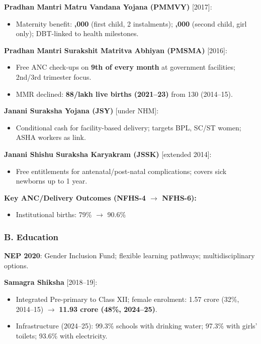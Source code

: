 \textbf{Pradhan Mantri Matru Vandana Yojana (PMMVY)} [2017]:
\begin{itemize}
  \item Maternity benefit: \textbf{,000} (first child, 2 instalments); \textbf{,000} (second child, girl only); DBT-linked to health milestones.
\end{itemize}

\textbf{Pradhan Mantri Surakshit Matritva Abhiyan (PMSMA)} [2016]:
\begin{itemize}
  \item Free ANC check-ups on \textbf{9th of every month} at government facilities; 2nd/3rd trimester focus.
  \item MMR declined: \textbf{88/lakh live births (2021--23)} from 130 (2014--15).
\end{itemize}

\textbf{Janani Suraksha Yojana (JSY)} [under NHM]:
\begin{itemize}
  \item Conditional cash for facility-based delivery; targets BPL, SC/ST women; ASHA workers as link.
\end{itemize}

\textbf{Janani Shishu Suraksha Karyakram (JSSK)} [extended 2014]:
\begin{itemize}
  \item Free entitlements for antenatal/post-natal complications; covers sick newborns up to 1 year.
\end{itemize}

\textbf{Key ANC/Delivery Outcomes (NFHS-4 $\rightarrow$ NFHS-6):}
\begin{itemize}
  \item Institutional births: 79\% $\rightarrow$ 90.6\%
\end{itemize}

\subsubsection*{B. Education}

\textbf{NEP 2020}: Gender Inclusion Fund; flexible learning pathways; multidisciplinary options.

\textbf{Samagra Shiksha} [2018--19]:
\begin{itemize}
  \item Integrated Pre-primary to Class XII; female enrolment: 1.57 crore (32\%, 2014--15) $\rightarrow$ \textbf{11.93 crore (48\%, 2024--25)}.
  \item Infrastructure (2024--25): 99.3\% schools with drinking water; 97.3\% with girls' toilets; 93.6\% with electricity.
\end{itemize}

